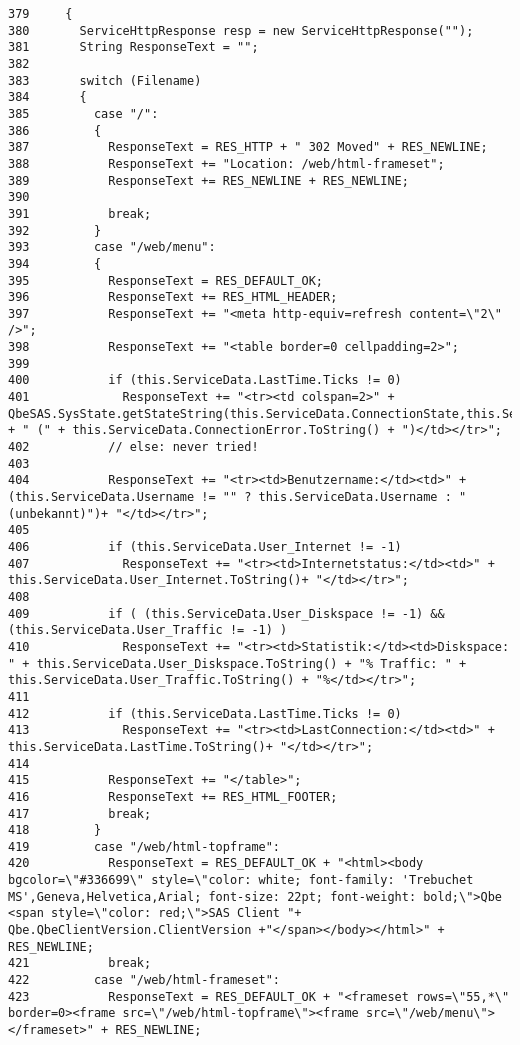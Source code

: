 \footnotesize\begin{verbatim}379     {
380       ServiceHttpResponse resp = new ServiceHttpResponse("");
381       String ResponseText = "";
382 
383       switch (Filename)
384       {
385         case "/":
386         {
387           ResponseText = RES_HTTP + " 302 Moved" + RES_NEWLINE; 
388           ResponseText += "Location: /web/html-frameset";
389           ResponseText += RES_NEWLINE + RES_NEWLINE;
390 
391           break;
392         }
393         case "/web/menu":
394         {
395           ResponseText = RES_DEFAULT_OK;
396           ResponseText += RES_HTML_HEADER;
397           ResponseText += "<meta http-equiv=refresh content=\"2\" />";
398           ResponseText += "<table border=0 cellpadding=2>";
399 
400           if (this.ServiceData.LastTime.Ticks != 0)
401             ResponseText += "<tr><td colspan=2>" + QbeSAS.SysState.getStateString(this.ServiceData.ConnectionState,this.ServiceData.User_Internet,this.ServiceData.Username) + " (" + this.ServiceData.ConnectionError.ToString() + ")</td></tr>";
402           // else: never tried!
403 
404           ResponseText += "<tr><td>Benutzername:</td><td>" + (this.ServiceData.Username != "" ? this.ServiceData.Username : "(unbekannt)")+ "</td></tr>";
405 
406           if (this.ServiceData.User_Internet != -1)
407             ResponseText += "<tr><td>Internetstatus:</td><td>" + this.ServiceData.User_Internet.ToString()+ "</td></tr>";
408 
409           if ( (this.ServiceData.User_Diskspace != -1) && (this.ServiceData.User_Traffic != -1) )
410             ResponseText += "<tr><td>Statistik:</td><td>Diskspace: " + this.ServiceData.User_Diskspace.ToString() + "% Traffic: " + this.ServiceData.User_Traffic.ToString() + "%</td></tr>";
411 
412           if (this.ServiceData.LastTime.Ticks != 0)
413             ResponseText += "<tr><td>LastConnection:</td><td>" + this.ServiceData.LastTime.ToString()+ "</td></tr>";
414 
415           ResponseText += "</table>";
416           ResponseText += RES_HTML_FOOTER;
417           break;
418         }
419         case "/web/html-topframe":
420           ResponseText = RES_DEFAULT_OK + "<html><body bgcolor=\"#336699\" style=\"color: white; font-family: 'Trebuchet MS',Geneva,Helvetica,Arial; font-size: 22pt; font-weight: bold;\">Qbe <span style=\"color: red;\">SAS Client "+ Qbe.QbeClientVersion.ClientVersion +"</span></body></html>" + RES_NEWLINE;
421           break;
422         case "/web/html-frameset":
423           ResponseText = RES_DEFAULT_OK + "<frameset rows=\"55,*\" border=0><frame src=\"/web/html-topframe\"><frame src=\"/web/menu\"></frameset>" + RES_NEWLINE;

\end{verbatim}
